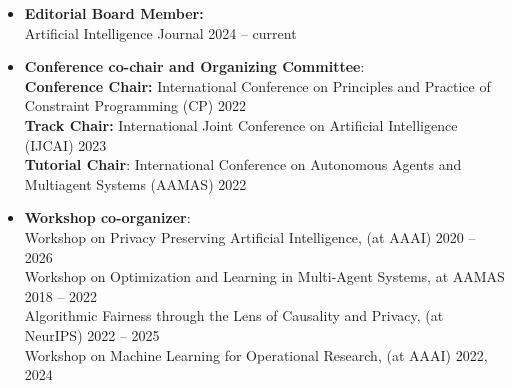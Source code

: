 \documentclass[localFont,alternative]{documentMETADATA}
\begin{document}

\vspace{6pt}
\vspace{6pt}
  \begin{itemize}
  	\item {\bf Editorial Board Member:}\\
  	Artificial Intelligence Journal \hfill{2024 -- current}
    \item {\bf Conference co-chair and Organizing Committee}:  \\
    {\bf Conference Chair:} International Conference on Principles and Practice of Constraint Programming (CP)  \hfill{2022}\\
    {\bf Track Chair:} International Joint Conference on Artificial Intelligence (IJCAI) \hfill{2023}\\
		{\bf Tutorial Chair}:  International Conference on Autonomous Agents and Multiagent Systems (AAMAS) \hfill{2022}
		
    \item {\bf Workshop co-organizer}: \\
    {Workshop on Privacy Preserving Artificial Intelligence, (at AAAI)}   \hfill{2020 -- 2026}\\
    {Workshop on Optimization and Learning in Multi-Agent Systems, at AAMAS} \hfill{2018 -- 2022}\\
    {Algorithmic Fairness through the Lens of Causality and Privacy, (at NeurIPS)} \hfill{2022 -- 2025}\\
    {Workshop on Machine Learning for Operational Research, (at AAAI)}   \hfill{2022, 2024}
    

\end{itemize}
\end{document}
